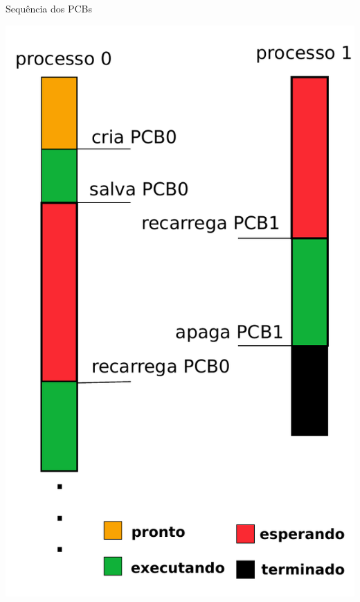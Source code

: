 \begin{frame}{Sequência dos PCBs}

\begin{center}
	\includegraphics[scale=0.45]{../_img/pcb-sequence}
\end{center}
\end{frame}


  
